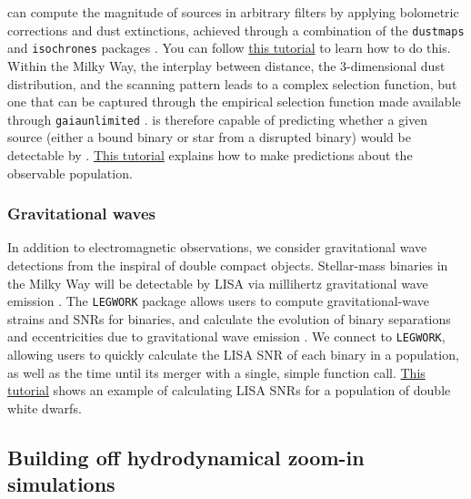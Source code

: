 \documentclass[twocolumn, twocolappendix, oneside, linenumbers]{aastex631}
\newcommand{\tutorialLink}[2]{\href{#1}{{\color{codecolour}#2}}}
\begin{document}
\cogsworth can compute the magnitude of sources in arbitrary filters by applying bolometric corrections and dust extinctions, achieved through a combination of the \texttt{dustmaps} and \texttt{isochrones} packages  \citep{2018JOSS....3..695M, Morton+2015:2015ascl.soft03010M}. You can follow \tutorialLink{https://cogsworth.readthedocs.io/en/latest/tutorials/observables/photometry.html}{this tutorial} to learn how to do this. Within the Milky Way, the interplay between distance, the 3-dimensional dust distribution, and the \gaia{} scanning pattern leads to a complex selection function, but one that can be captured through the empirical selection function made available through \texttt{gaiaunlimited} \citep{Cantat-Gaudin+2023:2023A&A...669A..55C}. \cogsworth is therefore capable of predicting whether a given source (either a bound binary or star from a disrupted binary) would be detectable by \gaia. \tutorialLink{https://cogsworth.readthedocs.io/en/latest/tutorials/observables/gaia.html}{This tutorial} explains how to make predictions about the observable \gaia population.

\subsubsection{Gravitational waves}

In addition to electromagnetic observations, we consider gravitational wave detections from the inspiral of double compact objects. Stellar-mass binaries in the Milky Way will be detectable by LISA via millihertz gravitational wave emission \citep{Amaro-Seoane+2017:2017arXiv170200786A}. The \texttt{LEGWORK} package allows users to compute gravitational-wave strains and SNRs for binaries, and calculate the evolution of binary separations and eccentricities due to gravitational wave emission \citep{LEGWORK_joss, LEGWORK_apjs}. We connect \cogsworth to \texttt{LEGWORK}, allowing users to quickly calculate the LISA SNR of each binary in a population, as well as the time until its merger with a single, simple function call. \tutorialLink{https://cogsworth.readthedocs.io/en/latest/tutorials/misc/lisa.html}{This tutorial} shows an example of calculating LISA SNRs for a \cogsworth population of double white dwarfs.

\subsection{Building off hydrodynamical zoom-in simulations}\label{sec:hydro_linking}
\end{document}
